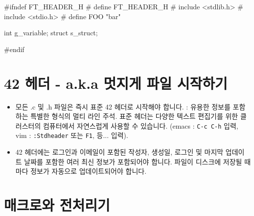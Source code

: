 \documentclass{42-ko}
\begin{document}
        \begin{42ccode}
#ifndef FT_HEADER_H
# define FT_HEADER_H
# include <stdlib.h>
# include <stdio.h>
# define FOO "bar"

int		g_variable;
struct	s_struct;

#endif
        \end{42ccode}
        \newpage



    \section{42 헤더 - a.k.a 멋지게 파일 시작하기}

        \begin{itemize}

        \item 모든 .c 및 .h 파일은 즉시 표준 42 헤더로 시작해야 합니다. : 유용한 정보를 
          포함하는 특별한 형식의 멀티 라인 주석. 표준 헤더는 다양한 텍스트 편집기를 위한 
          클러스터의 컴퓨터에서 자연스럽게 사용할 수 있습니다. (emacs : \texttt{C-c C-h} 입력, 
          vim : \texttt{:Stdheader} 또는 \texttt{F1}, 등... 입력).

        \item 42 헤더에는 로그인과 이메일이 포함된 작성자, 생성일, 로그인 및 마지막 업데이트 
          날짜를 포함한 여러 최신 정보가 포함되어야 합니다. 파일이 디스크에 저장될 때마다 
          정보가 자동으로 업데이트되어야 합니다.

        \end{itemize}
        \newpage


    \section{매크로와 전처리기}
\end{document}
